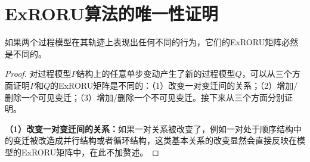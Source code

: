 \chapter{ExRORU算法的唯一性证明}
\label{app:uniqueness}

\begin{theorem}[唯一性]
如果两个过程模型在其轨迹上表现出任何不同的行为，它们的ExRORU矩阵必然是不同的。
\end{theorem}

\begin{proof}
对过程模型$P$结构上的任意单步变动产生了新的过程模型$Q$，可以从三个方面证明$P$和$Q$的ExRORU矩阵是不同的：（1）改变一对变迁间的关系；（2）增加/删除一个可见变迁；（3）增加/删除一个不可见变迁。接下来从三个方面分别证明。

\textbf{（1）改变一对变迁间的关系：}如果一对关系被改变了，例如一对处于顺序结构中的变迁被改造成并行结构或者循环结构，这类基本关系的改变显然会直接反映在模型的ExRORU矩阵中，在此不加赘述。


\end{proof}
